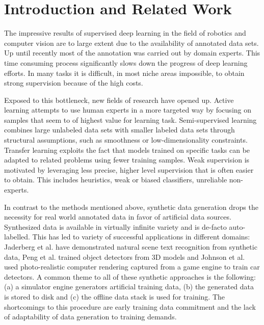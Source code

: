 \documentclass[conference]{IEEEtran}
\begin{document}
\section{Introduction and Related Work}
The impressive results of supervised deep learning in the field of robotics and computer vision are to large extent due to the availability of annotated data sets. Up until recently most of the annotation was carried out by domain experts. This time consuming process significantly slows down the progress of deep learning efforts. In many tasks it is difficult, in most niche areas impossible, to obtain strong supervision because of the high costs.

Exposed to this bottleneck, new fields of research have opened up. Active learning \cite{druck2009active, settles2012active, cakmak2012designing} attempts to use human experts in a more targeted way by focusing on samples that seem to of highest value for learning task. Semi-supervised learning \cite{chapelle2009semi, salimans2016improved, zhu2006semi} combines large unlabeled data sets with smaller labeled data sets through structural assumptions, such as smoothness or low-dimensionality constraints. Transfer learning \cite{pratt1993discriminability, ventura2007theoretical, pan2010survey} exploits the fact that models trained on specific tasks can be adapted to related problems using fewer training samples. Weak supervision \cite{ratner2016data, zhou2017brief} is motivated by leveraging less precise, higher level supervision that is often easier to obtain. This includes heuristics, weak or biased classifiers, unreliable non-experts. 


In contrast to the methods mentioned above, synthetic data generation drops the necessity for real world annotated data in favor of artificial data sources. Synthesized data is available in virtually infinite variety and is de-facto auto-labelled. This has led to variety of successful applications in different domains: Jaderberg et al. \cite{jaderberg2014synthetic} have demonstrated natural scene text recognition from synthetic data, Peng et al. \cite{peng2015learning} trained object detectors from 3D models and Johnson et al. \cite{2017_Johnson_DrivingInTheMatrix} used photo-realistic computer rendering captured from a game engine to train car detectors. A common theme to all of these synthetic approaches is the following: (a) a simulator engine generators artificial training data, (b) the generated data is stored to disk and (c) the offline data stack is used for training. The shortcomings to this procedure are early training data commitment and the lack of adaptability of data generation to training demands.
\end{document}
